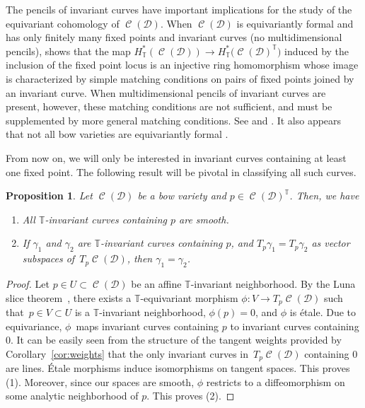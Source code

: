 \documentclass[pdftex]{sigma}
\numberwithin{equation}{section}
\newtheorem{Proposition}[Theorem]{Proposition}
 { \theoremstyle{definition}
\newtheorem{Definition}[Theorem]{Definition}
\newtheorem{Note}[Theorem]{Note}
\newtheorem{Example}[Theorem]{Example}
\newtheorem{Remark}[Theorem]{Remark} }
\newcommand{\brane}{\mathcal D}
\newcommand{\torus}{\mathbb T}
\DeclareMathOperator{\bowvar}{\mathcal C}
\begin{document}
The pencils of invariant curves have important implications for the study of the equivariant cohomology of $\bowvar(\brane)$. When $\bowvar(\brane)$ is equivariantly formal and has only finitely many fixed points and invariant curves (no multidimensional pencils), \cite{GKM} shows that the map $H^*_\torus (\bowvar(\brane)) \to H^*_\torus \bigl(\bowvar(\brane)^\torus\bigr)$ induced by the inclusion of the fixed point locus is an injective ring homomorphism whose image is characterized by simple matching conditions on pairs of fixed points joined by an invariant curve. When multidimensional pencils of invariant curves are present, however, these matching conditions are not sufficient, and must be supplemented by more general matching conditions. See \cite{CS} and \cite[Section~7.4]{equiv_coh}. It also appears that not all bow varieties are equivariantly formal \cite{yibo}.

From now on, we will only be interested in invariant curves containing at least one fixed point. The following result will be pivotal in classifying all such curves.

\begin{Proposition} \label{prop:equiv_geo}
Let $\bowvar(\brane)$ be a bow variety and $p \in \bowvar(\brane)^\torus$. Then, we have
\begin{enumerate}\itemsep=0pt
\item[$(1)$] All $\torus$-invariant curves containing $p$ are smooth.
\item[$(2)$] If $\gamma_1$ and $\gamma_2$ are $\torus$-invariant curves containing $p$, and $T_p\gamma_1=T_p\gamma_2$ as vector subspaces of~$T_p\bowvar(\brane)$, then $\gamma_1 = \gamma_2$.
\end{enumerate}
\end{Proposition}

\begin{proof}
Let $p\in U \subset \bowvar(\brane)$ be an affine $\torus$-invariant neighborhood. By the Luna slice theorem~\cite[Appendix of Chapter~1]{MFK}, there exists a $\torus$-equivariant morphism $\phi\colon V \to T_p \bowvar(\brane)$ such that~${p \in V \subset U}$ is a $\torus$-invariant neighborhood, $\phi(p) = 0$, and $\phi$ is \'etale. Due to equivariance, $\phi$~maps invariant curves containing $p$ to invariant curves containing $0$. It can be easily seen from the structure of the tangent weights provided by Corollary~\ref{cor:weights} that the only invariant curves in~$T_p\bowvar(\brane)$ containing $0$ are lines. \'Etale morphisms induce isomorphisms on tangent spaces. This proves (1). Moreover, since our spaces are smooth, $\phi$ restricts to a diffeomorphism on some analytic neighborhood of $p$. This proves (2).
\end{proof}
\end{document}
